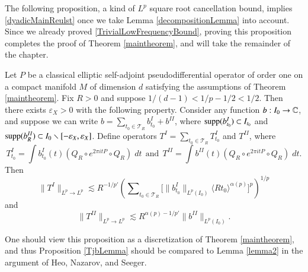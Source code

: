 The following proposition, a kind of $L^p$ square root cancellation bound, implies \eqref{dyadicMainReulst} once we take Lemma \ref{decompositionLemma} into account. %
Since we already proved \eqref{TrivialLowFrequencyBound}, proving this proposition completes the proof of Theorem \ref{maintheorem}, and will take the remainder of the chapter.

\begin{prop} \label{TjbLemma}
    Let $P$ be a classical elliptic self-adjoint pseudodifferential operator of order one on a compact manifold $M$ of dimension $d$ satisfying the assumptions of Theorem \ref{maintheorem}. Fix $R > 0$ and suppose $1/(d-1) < 1/p - 1/2 < 1/2$. Then there exists $\varepsilon_X > 0$ with the following property. Consider any function $b: I_0 \to \operatorname{\mathbb{C}}$, and suppose we can write $b = \sum\nolimits_{t_0 \in \mathcal{T}_R} b_{t_0}^I + b^{II}$, where $\operatorname{\text{supp}}(b_{t_0}^I) \subset I_{t_0}$ and $\operatorname{\text{supp}}(b_R^{II}) \subset I_0 \smallsetminus [-\varepsilon_X,\varepsilon_X]$. Define operators $T^I = \sum\nolimits_{t_0 \in \mathcal{T}_R} T^I_{t_0}$ and $T^{II}$, where
    \[ T_{t_0}^I = \int b_{t_0}^I(t) ( Q_R \circ e^{2 \pi i tP} \circ Q_R )\; dt\ \ \text{and}\ \ T^{II} = \int b^{II}(t) ( Q_R \circ e^{2 \pi i tP} \circ Q_R)\; dt. \]
    Then
    \begin{equation} \label{ejqwoifjeoifjwqoifjwqoi}
        \| T^I \|_{L^p \to L^p} \lesssim R^{-1/p'} \left( \sum\nolimits_{t_0 \in \mathcal{T}_R} \Big[ \| b^I_{t_0} \|_{L^p(I_0)} \langle R t_0 \rangle^{\alpha(p)} \Big]^{p} \right)^{1/p}
    \end{equation}
    and
    \begin{equation} \label{DPOIJAOIWDJQWIOFJQOIVJIEOVNFNJNVNV}
        \| T^{II} \|_{L^p \to L^p} \lesssim R^{\alpha(p) - 1/p'} \| b^{II} \|_{L^p(I_0)}.
    \end{equation}
\end{prop}

\begin{remark}
    One should view this proposition as a discretization of Theorem \ref{maintheorem}, and thus Proposition \ref{TjbLemma} should be compared to Lemma \ref{lemma2} in the argument of Heo, Nazarov, and Seeger.
\end{remark}


